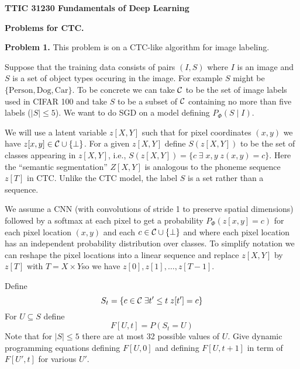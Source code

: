 \documentclass{article}
\begin{document}
\centerline{\bf TTIC 31230 Fundamentals of Deep Learning}

\bigskip

\centerline{\bf Problems for CTC.}

\bigskip
\bigskip
{\bf Problem 1.} This problem is on a CTC-like algorithm for image labeling.

Suppose that the training data consists of pairs $(I,S)$ where $I$ is an image and $S$
is a set of object types occuring in the image.  For example $S$ might be $\{\mathrm{Person},\mathrm{Dog},\mathrm{Car}\}$.
To be concrete we can take ${\cal C}$ to be the set of image labels used in CIFAR 100 and take $S$ to be a subset
of ${\cal C}$ containing no more than five labels ($|S| \leq 5$).
We want to do SGD on a model defining $P_\Phi(S\;|\;I)$.

We will use a latent variable $z[X,Y]$ such that for pixel coordinates $(x,y)$ we have $z[x,y] \in {\cal C} \cup \{\bot\}$.
For a given $z[X,Y]$ define $S(z[X,Y])$ to be the set of classes appearing in $z[X,Y]$, i.e.,
$S(z[X,Y]) = \{c\;\exists\;x,y\;z(x,y) = c\}$. Here the ``semantic segmentation'' $Z[X,Y]$ is analogous to the phoneme
sequence $z[T]$ in CTC. Unlike the CTC model, the label
$S$ is a set rather than a sequence.

We assume a CNN (with convolutions of stride 1 to preserve spatial dimensions) followed by
a softmax at each pixel to get a probability
$P_\Phi(z[x,y] = c)$ for each pixel location $(x,y)$ and each $c \in {\cal C} \cup \{\bot\}$ and where
each pixel location has an independent probability distribution over classes. 
To simplify notation we can reshape the pixel locations into a linear sequence
and replace $z[X,Y]$ by $z[T]$ with $T = X \times Y$so we have $z[0],z[1],\ldots,z[T-1]$.

Define
$$S_t = \{c \in {\cal C}\;\exists t'\leq t\;z[t'] = c\}$$
For $U \subseteq S$ define
$$F[U,t] = P(S_t = U)$$
Note that for $|S| \leq 5$ there are at most 32 possible values of $U$.
Give dynamic programming equations defining $F[U,0]$ and defining $F[U,t+1]$ in term of $F[U',t]$ for various $U'$.



  
\end{document}
